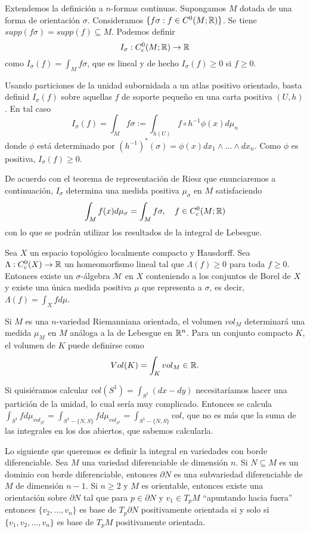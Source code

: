 \documentclass[CV.tex]{subfiles}
\begin{document}
\begin{nota}
Extendemos la definición a $n$-formas continuas. Supongamos $M$ dotada de una forma de orientación $\sigma$. Consideramos $\{f\sigma:f\in C^0(M;\mathbb{R})\}$. Se tiene $supp(f\sigma)=supp(f)\subseteq M$. Podemos definir 
\[
I_\sigma:C_c^0(M;\mathbb{R})\to\mathbb{R}
\]
como $I_\sigma(f)=\int_M f\sigma$, que es lineal y de hecho $I_\sigma(f)\geq 0$ si $f\geq 0$. 

Usando particiones de la unidad subornidada a un atlas positivo orientado, basta definid $I_\sigma(f)$ sobre aquellas $f$ de soporte pequeño en una carta positiva $(U,h)$. En tal caso
\[
I_\sigma(f)=\int_M f\sigma:=\int_{h(U)}f\circ h^{-1}\phi(x) d\mu_n
\]
donde $\phi$ está determinado por $(h^{-1})^*(\sigma)=\phi(x)dx_1\land\dots\land dx_n$. Como $\phi$ es positiva, $I_\sigma(f)\geq 0$.

De acuerdo con el teorema de representación de Riesz que enunciaremos a continuación, $I_\sigma$ determina una medida positiva $\mu_\sigma$ en $M$ satisfaciendo
\[
\int_M f(x)d\mu_\sigma=\int_M f\sigma, \quad f\in C_c^0(M;\mathbb{R})
\]
con lo que se podrán utilizar los resultados de la integral de Lebesgue. 

\begin{teorema}
Sea $X$ un espacio topológico localmente compacto y Hausdorff. Sea $\Lambda:C_c^0(X)\to\mathbb{R}$ un homeomorfismo lineal tal que $\Lambda(f)\geq 0$ para toda $f\geq 0$. Entonces existe un $\sigma$-álgebra $\mathcal{M}$ en $X$ conteniendo a los conjuntos de Borel de $X$ y existe una única medida positiva $\mu$ que representa a $\sigma$, es decir, $\Lambda(f)=\int_X f d\mu$.
\end{teorema}

Si $M$ es una $n$-variedad Riemanniana orientada, el volumen $vol_M$ determinará una medida $\mu_M$ en $M$ análoga a la de Lebesgue en $\mathbb{R}^n$. Para un conjunto compacto $K$, el volumen de $K$ puede definirse como 
\[
Vol(K)=\int_K vol_M\in\mathbb{R}.
\]
\end{nota}

\begin{ej}
Si quisiéramos calcular $vol(S^1)=\int_{S^1} (dx- dy)$ necesitaríamos hacer una partición de la unidad, lo cual sería muy complicado. Entonces se calcula $\int_{S^1} f d\mu_{vol_{S^1}}=\int_{S^1-\{N,S\}} f d\mu_{vol_{S^1}}=\int_{S^1-\{N,S\}} vol$, que no es más que la suma de las integrales en los dos abiertos, que sabemos calcularla.
\end{ej}

Lo siguiente que queremos es definir la integral en variedades con borde diferenciable. Sea $M$ una variedad diferenciable de dimensión $n$. Si $N\subseteq M$ es un dominio con borde diferenciable, entonces $\partial N$ es una subvariedad diferenciable de $M$ de dimensión $n-1$. Si $n\geq 2$ y $M$ es orientable, entonces existe una orientación sobre $\partial N$ tal que para $p\in\partial N$ y $v_1\in T_pM$ ``apuntando hacia fuera'' entonces $\{v_2,\dots, v_n\}$ es base de $T_p\partial N$ positivamente orientada si y solo si $\{v_1,v_2,\dots, v_n\}$ es base de $T_pM$ positivamente orientada. 
\end{document}
